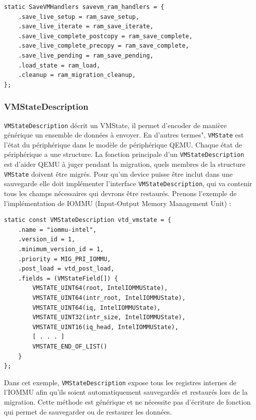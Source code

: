 \begin{lstlisting}[caption={Exemple d'une structure de donnée SaveVMHandlers},captionpos=b]
static SaveVMHandlers savevm_ram_handlers = {
    .save_live_setup = ram_save_setup,
    .save_live_iterate = ram_save_iterate,
    .save_live_complete_postcopy = ram_save_complete,
    .save_live_complete_precopy = ram_save_complete,
    .save_live_pending = ram_save_pending,
    .load_state = ram_load,
    .cleanup = ram_migration_cleanup,
};
\end{lstlisting}

\subsubsection*{VMStateDescription}
\texttt{VMStateDescription} décrit un VMState, il permet d'encoder de manière générique un ensemble de données à envoyer.
En d'autres termes", \texttt{VMState} est l'état du périphérique dans le modèle de périphérique QEMU.
Chaque état de périphérique a une structure.
La fonction principale d'un \texttt{VMStateDescription} est d'aider QEMU à juger pendant la migration, quels membres de la structure \texttt{VMState} doivent être migrés.
Pour qu'un device puisse être inclut dans une sauvegarde elle doit implémenter l'interface \texttt{VMStateDescription}, qui va contenir tous les champs nécessaires qui devrons être restaurés.
Prenons l'exemple de l'implémentation de IOMMU (Input-Output Memory Management Unit) :

\begin{lstlisting}[caption={Exemple d'une structure de donnée VMStateDescription},captionpos=b]
static const VMStateDescription vtd_vmstate = {
    .name = "iommu-intel",
    .version_id = 1,
    .minimum_version_id = 1,
    .priority = MIG_PRI_IOMMU,
    .post_load = vtd_post_load,
    .fields = (VMStateField[]) {
        VMSTATE_UINT64(root, IntelIOMMUState),
        VMSTATE_UINT64(intr_root, IntelIOMMUState),
        VMSTATE_UINT64(iq, IntelIOMMUState),
        VMSTATE_UINT32(intr_size, IntelIOMMUState),
        VMSTATE_UINT16(iq_head, IntelIOMMUState),
        [ . . . ]
        VMSTATE_END_OF_LIST()
    }
};
\end{lstlisting}

Dans cet exemple, \texttt{VMStateDescription} expose tous les registres internes de l'IOMMU afin qu'ils soient automatiquement sauvegardés et restaurés lors de la migration.
Cette méthode est générique et ne nécessite pas d'écriture de fonction qui permet de sauvegarder ou de restaurer les données.


